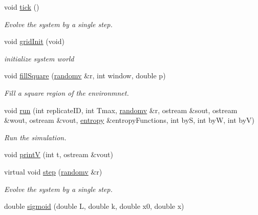 \begin{DoxyCompactItemize}
\item 
\mbox{\label{classsystem_ada156ed7f1068472dcede241f659a24a}} 
void \hyperlink{classsystem_ada156ed7f1068472dcede241f659a24a}{tick} ()
\begin{DoxyCompactList}\small\item\em Evolve the system by a single step. \end{DoxyCompactList}\item 
\mbox{\label{classsystem_adfc9931a4de3d0fca13773ac86c9c63f}} 
void \hyperlink{classsystem_adfc9931a4de3d0fca13773ac86c9c63f}{grid\+Init} (void)
\begin{DoxyCompactList}\small\item\em initialize system world \end{DoxyCompactList}\item 
void \hyperlink{classsystem_ae1cb4d26da7e546b5a6bb1c5b21d1abe}{fill\+Square} (\hyperlink{classrandomv}{randomv} \&r, int window, double p)
\begin{DoxyCompactList}\small\item\em Fill a square region of the environmnet. \end{DoxyCompactList}\item 
void \hyperlink{classsystem_a96961c5218682019c8d1f9f1a01512f1}{run} (int replicate\+ID, int Tmax, \hyperlink{classrandomv}{randomv} \&r, ostream \&sout, ostream \&wout, ostream \&vout, \hyperlink{classentropy}{entropy} \&entropy\+Functions, int byS, int byW, int byV)
\begin{DoxyCompactList}\small\item\em Run the simulation. \end{DoxyCompactList}\item 
void \hyperlink{classsystem_a5536661225ddf0de78c4b81fd8b34978}{printV} (int t, ostream \&vout)
\item 
\mbox{\label{classsystem_aab28302f43e7ee42da51eb723f091533}} 
virtual void \hyperlink{classsystem_aab28302f43e7ee42da51eb723f091533}{step} (\hyperlink{classrandomv}{randomv} \&r)
\begin{DoxyCompactList}\small\item\em Evolve the system by a single step. \end{DoxyCompactList}\item 
double \hyperlink{classsystem_ac4e59474bfe93c5ca7ac46a79d738a4b}{sigmoid} (double L, double k, double x0, double x)
\end{DoxyCompactItemize}


